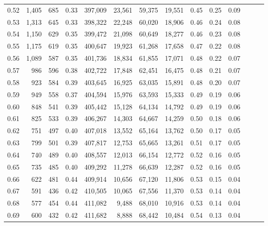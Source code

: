 \begin{tabular}{rrrrrrrrrrrrrr}
0.52 &   1,405 &    685 &  0.33 &  397,009 &   23,561 &  59,375 &  19,551 &  0.45 &  0.25 &      0.09 \\
0.53 &   1,313 &    645 &  0.33 &  398,322 &   22,248 &  60,020 &  18,906 &  0.46 &  0.24 &      0.08 \\
0.54 &   1,150 &    629 &  0.35 &  399,472 &   21,098 &  60,649 &  18,277 &  0.46 &  0.23 &      0.08 \\
0.55 &   1,175 &    619 &  0.35 &  400,647 &   19,923 &  61,268 &  17,658 &  0.47 &  0.22 &      0.08 \\
0.56 &   1,089 &    587 &  0.35 &  401,736 &   18,834 &  61,855 &  17,071 &  0.48 &  0.22 &      0.07 \\
0.57 &     986 &    596 &  0.38 &  402,722 &   17,848 &  62,451 &  16,475 &  0.48 &  0.21 &      0.07 \\
0.58 &     923 &    584 &  0.39 &  403,645 &   16,925 &  63,035 &  15,891 &  0.48 &  0.20 &      0.07 \\
0.59 &     949 &    558 &  0.37 &  404,594 &   15,976 &  63,593 &  15,333 &  0.49 &  0.19 &      0.06 \\
0.60 &     848 &    541 &  0.39 &  405,442 &   15,128 &  64,134 &  14,792 &  0.49 &  0.19 &      0.06 \\
0.61 &     825 &    533 &  0.39 &  406,267 &   14,303 &  64,667 &  14,259 &  0.50 &  0.18 &      0.06 \\
0.62 &     751 &    497 &  0.40 &  407,018 &   13,552 &  65,164 &  13,762 &  0.50 &  0.17 &      0.05 \\
0.63 &     799 &    501 &  0.39 &  407,817 &   12,753 &  65,665 &  13,261 &  0.51 &  0.17 &      0.05 \\
0.64 &     740 &    489 &  0.40 &  408,557 &   12,013 &  66,154 &  12,772 &  0.52 &  0.16 &      0.05 \\
0.65 &     735 &    485 &  0.40 &  409,292 &   11,278 &  66,639 &  12,287 &  0.52 &  0.16 &      0.05 \\
0.66 &     622 &    481 &  0.44 &  409,914 &   10,656 &  67,120 &  11,806 &  0.53 &  0.15 &      0.04 \\
0.67 &     591 &    436 &  0.42 &  410,505 &   10,065 &  67,556 &  11,370 &  0.53 &  0.14 &      0.04 \\
0.68 &     577 &    454 &  0.44 &  411,082 &    9,488 &  68,010 &  10,916 &  0.53 &  0.14 &      0.04 \\
0.69 &     600 &    432 &  0.42 &  411,682 &    8,888 &  68,442 &  10,484 &  0.54 &  0.13 &      0.04 \\

\end{tabular}
